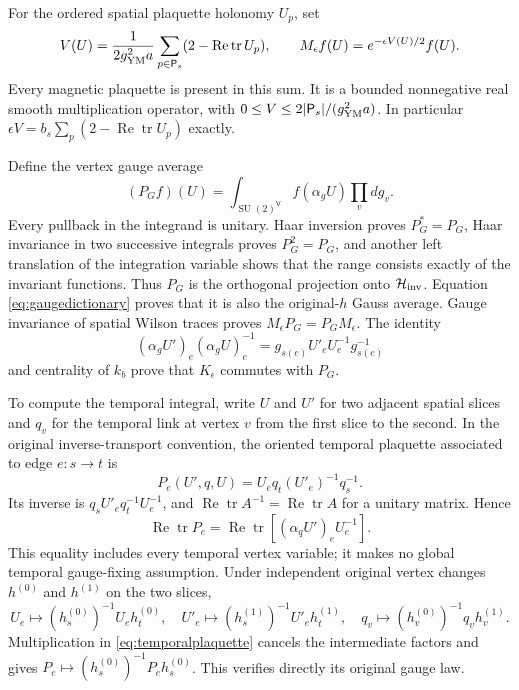 \documentclass[11pt]{article}
\newcommand{\SU}{\operatorname{SU}}
\newcommand{\tr}{\operatorname{tr}}
\newcommand{\Rea}{\operatorname{Re}}
\begin{document}
For the ordered spatial plaquette holonomy $U_p$, set
\begin{equation}\label{eq:magnetic}
 V(U)=\frac1{2g_{\rm YM}^2a}
        \sum_{p\in\mathsf P_s}(2-\Rea\tr U_p),\qquad
 M_\epsilon f(U)=e^{-\epsilon V(U)/2}f(U).
\end{equation}
Every magnetic plaquette is present in this sum. It is a bounded
nonnegative real smooth multiplication operator, with
$0\leq V\leq2|\mathsf P_s|/(g_{\rm YM}^2a)$.
In particular $\epsilon V=b_s\sum_p(2-\Rea\tr U_p)$ exactly.

Define the vertex gauge average
\begin{equation}\label{eq:Gauss}
 (P_Gf)(U)=\int_{\SU(2)^{\mathsf V}}f(\alpha_gU)\prod_vdg_v.
\end{equation}
Every pullback in the integrand is unitary. Haar inversion proves
$P_G^*=P_G$, Haar invariance in two successive integrals proves
$P_G^2=P_G$, and another left translation of the integration variable
shows that the range consists exactly of the invariant functions.
Thus $P_G$ is the orthogonal projection onto
$\mathcal H_{\rm inv}$. Equation \eqref{eq:gaugedictionary} proves that
it is also the original-$h$ Gauss average. Gauge invariance of spatial
Wilson traces proves $M_\epsilon P_G=P_GM_\epsilon$.
The identity
\[
 (\alpha_gU')_e(\alpha_gU)_e^{-1}
 =g_{s(e)}U'_eU_e^{-1}g_{s(e)}^{-1}
\]
and centrality of $k_b$ prove that $K_\epsilon$ commutes with $P_G$.

To compute the temporal integral, write $U$ and $U'$ for two adjacent
spatial slices and $q_v$ for the temporal link at vertex $v$ from the
first slice to the second. In the original inverse-transport convention,
the oriented temporal plaquette associated to edge $e:s\to t$ is
\begin{equation}\label{eq:temporalplaquette}
 P_e(U',q,U)=U_eq_t(U'_e)^{-1}q_s^{-1}.
\end{equation}
Its inverse is $q_sU'_eq_t^{-1}U_e^{-1}$, and $\Rea\tr A^{-1}=
\Rea\tr A$ for a unitary matrix. Hence
\begin{equation}\label{eq:temporal-conjugacy}
 \Rea\tr P_e=\Rea\tr[(\alpha_qU')_eU_e^{-1}].
\end{equation}
This equality includes every temporal vertex variable; it makes no
global temporal gauge-fixing assumption. Under independent original
vertex changes $h^{(0)}$ and $h^{(1)}$ on the two slices,
\[
 U_e\mapsto(h_s^{(0)})^{-1}U_eh_t^{(0)},\quad
 U'_e\mapsto(h_s^{(1)})^{-1}U'_eh_t^{(1)},\quad
 q_v\mapsto(h_v^{(0)})^{-1}q_vh_v^{(1)}.
\]
Multiplication in \eqref{eq:temporalplaquette} cancels the intermediate
factors and gives $P_e\mapsto(h_s^{(0)})^{-1}P_eh_s^{(0)}$.
This verifies directly its original gauge law.
\end{document}
